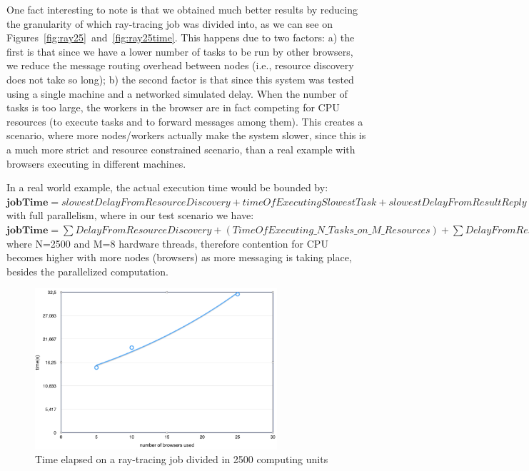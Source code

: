 One fact interesting to note is that we obtained much better results by reducing the granularity of which ray-tracing job was divided into, as we can see on Figures~\ref{fig:ray25}~and~\ref{fig:ray25time}. This happens due to two factors: a) the first is that since we have a lower number of tasks to be run by other browsers, we reduce the message routing overhead between nodes (i.e., resource discovery does not take so long); b) the second factor is that since this system was tested using a single machine and a networked simulated delay. When the number of tasks is too large, the workers in the browser are in fact competing for CPU resources (to execute tasks and to forward messages among them). This creates a scenario, where more nodes/workers actually  make the system slower, since this is a much more strict and resource constrained scenario, than a real example with browsers executing in different machines.

In a real world example, the actual execution time would be bounded by:\\

$\textbf{jobTime}=slowestDelayFromResourceDiscovery+timeOfExecutingSlowestTask+slowestDelayFromResultReply (1)$ \\

with full parallelism, where in our test scenario we have: \\

$\textbf{jobTime}=\sum{DelayFromResourceDiscovery}+(TimeOfExecuting\_N\_Tasks\_on\_M\_Resources)+\sum{DelayFromResultReply} (2)$\\

where N=2500 and M=8 hardware threads, therefore contention for CPU becomes higher with more nodes (browsers) as more messaging is taking place, besides the parallelized computation.

\begin{figure}[]
  \centering
  \includegraphics[width=0.8\textwidth]{figs/1.png}
  \caption{Time elapsed on a ray-tracing job divided in 2500 computing units}
  \label{fig:ray2500}
\end{figure}

